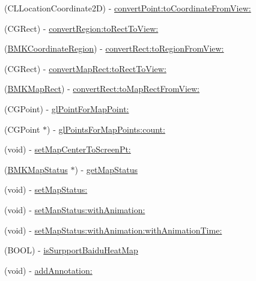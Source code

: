\begin{DoxyCompactItemize}
\item 
(C\+L\+Location\+Coordinate2\+D) -\/ \hyperlink{interface_b_m_k_map_view_a6ab0dbfdf28bf2ab29174d9a70ce2e9c}{convert\+Point\+:to\+Coordinate\+From\+View\+:}
\item 
(C\+G\+Rect) -\/ \hyperlink{interface_b_m_k_map_view_a952023c2e24a13c993977d276745f329}{convert\+Region\+:to\+Rect\+To\+View\+:}
\item 
(\hyperlink{struct_b_m_k_coordinate_region}{B\+M\+K\+Coordinate\+Region}) -\/ \hyperlink{interface_b_m_k_map_view_ae99130c0eceabae6c9e202699ba375d1}{convert\+Rect\+:to\+Region\+From\+View\+:}
\item 
(C\+G\+Rect) -\/ \hyperlink{interface_b_m_k_map_view_a4a802244887690c7238bd5c8e18918ae}{convert\+Map\+Rect\+:to\+Rect\+To\+View\+:}
\item 
(\hyperlink{struct_b_m_k_map_rect}{B\+M\+K\+Map\+Rect}) -\/ \hyperlink{interface_b_m_k_map_view_afa77dab84c13620c4ce0dee46df87b46}{convert\+Rect\+:to\+Map\+Rect\+From\+View\+:}
\item 
(C\+G\+Point) -\/ \hyperlink{interface_b_m_k_map_view_ad2ae70da77b6ba304cd37413fe5a5c78}{gl\+Point\+For\+Map\+Point\+:}
\item 
(C\+G\+Point $\ast$) -\/ \hyperlink{interface_b_m_k_map_view_a56625ec8600403ba03d20cfa0715ee61}{gl\+Points\+For\+Map\+Points\+:count\+:}
\item 
(void) -\/ \hyperlink{interface_b_m_k_map_view_afc552204ea098d293a4f0d7ebf35b8ac}{set\+Map\+Center\+To\+Screen\+Pt\+:}
\item 
(\hyperlink{interface_b_m_k_map_status}{B\+M\+K\+Map\+Status} $\ast$) -\/ \hyperlink{interface_b_m_k_map_view_a419f8ac73742ccf9ef7fb921b349bca4}{get\+Map\+Status}
\item 
(void) -\/ \hyperlink{interface_b_m_k_map_view_a595b3baaa42f35fd5fa3b778011a59d7}{set\+Map\+Status\+:}
\item 
(void) -\/ \hyperlink{interface_b_m_k_map_view_abf8e2308ae62e367f8b1271a9918060f}{set\+Map\+Status\+:with\+Animation\+:}
\item 
(void) -\/ \hyperlink{interface_b_m_k_map_view_a9668d8aa419c7a9140c79846fabc3598}{set\+Map\+Status\+:with\+Animation\+:with\+Animation\+Time\+:}
\item 
(B\+O\+O\+L) -\/ \hyperlink{interface_b_m_k_map_view_a2256a65857b14f9cd56655663a966e14}{is\+Surpport\+Baidu\+Heat\+Map}
\item 
(void) -\/ \hyperlink{interface_b_m_k_map_view_a2af9ed45c3a7fd530dd414dc573327b3}{add\+Annotation\+:}
\item 

\end{DoxyCompactItemize}
